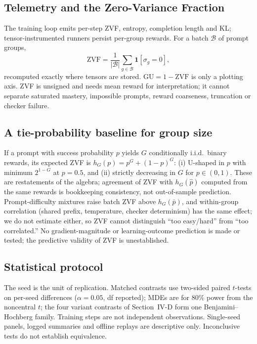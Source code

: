 \documentclass[conference]{IEEEtran}
\begin{document}
\subsection{Telemetry and the Zero-Variance Fraction}
The training loop emits per-step ZVF, entropy, completion length and KL;
tensor-instrumented runners persist per-group rewards. For a batch
$\mathcal{B}$ of prompt groups,
\begin{equation}
\mathrm{ZVF} = \frac{1}{|\mathcal{B}|}\sum_{g\in\mathcal{B}}
\mathbf{1}\left[\sigma_g = 0\right],
\label{eq:zvf}
\end{equation}
recomputed exactly where tensors are stored. $\mathrm{GU}=1-\mathrm{ZVF}$ is
only a plotting axis. ZVF is unsigned and needs mean reward for
interpretation; it cannot separate saturated mastery, impossible prompts,
reward coarseness, truncation or checker failure.

\subsection{A tie-probability baseline for group size}
If a prompt with success probability $p$ yields $G$ conditionally i.i.d.\
binary rewards, its expected ZVF is $h_G(p)=p^G+(1-p)^G$: (i) U-shaped in
$p$ with minimum $2^{1-G}$ at $p=0.5$, and (ii) strictly decreasing in $G$
for $p\in(0,1)$. These are restatements of the algebra; agreement of ZVF
with $h_G(\hat p)$ computed from the same rewards is bookkeeping
consistency, not out-of-sample prediction. Prompt-difficulty mixtures raise
batch ZVF above $h_G(\bar p)$, and within-group correlation (shared prefix,
temperature, checker determinism) has the same effect; we do not estimate
either, so ZVF cannot distinguish ``too easy/hard'' from ``too correlated.''
No gradient-magnitude or learning-outcome prediction is made or tested; the
predictive validity of ZVF is unestablished.

\subsection{Statistical protocol}
The seed is the unit of replication. Matched contrasts use two-sided paired
$t$-tests on per-seed differences ($\alpha=0.05$, df reported); MDEs are
for 80\% power from the noncentral $t$; the four variant contrasts of
Section~IV-D form one Benjamini--Hochberg family. Training steps are not
independent observations. Single-seed panels, logged summaries and offline
replays are descriptive only. Inconclusive tests do not establish
equivalence.
\end{document}
